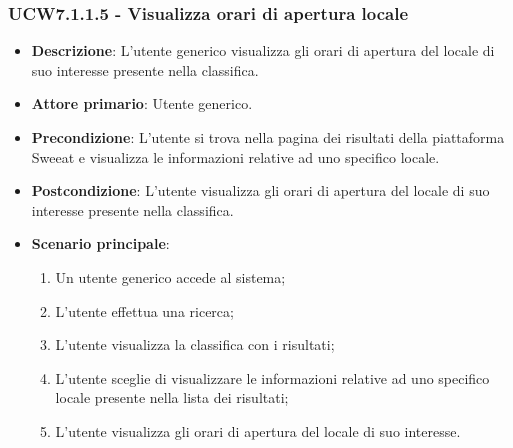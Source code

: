 \subsubsection{UCW7.1.1.5 - Visualizza orari di apertura locale}
\begin{itemize}
	\item \textbf{Descrizione}: L'utente generico visualizza gli orari di apertura del locale di suo interesse presente nella classifica.
    \item \textbf{Attore primario}: Utente generico.
    \item \textbf{Precondizione}: L’utente si trova nella pagina dei risultati della piattaforma Sweeat e visualizza le informazioni relative ad uno specifico locale.
    \item \textbf{Postcondizione}: L’utente visualizza gli orari di apertura del locale di suo interesse presente nella classifica.
    \item \textbf{Scenario principale}: 
    \begin{enumerate}
        \item Un utente generico accede al sistema;
        \item L’utente effettua una ricerca;
        \item L'utente visualizza la classifica con i risultati;
        \item L'utente sceglie di visualizzare le informazioni relative ad uno specifico locale presente nella lista dei risultati;
        \item L'utente visualizza gli orari di apertura del locale di suo interesse.
    \end{enumerate}
\end{itemize}

